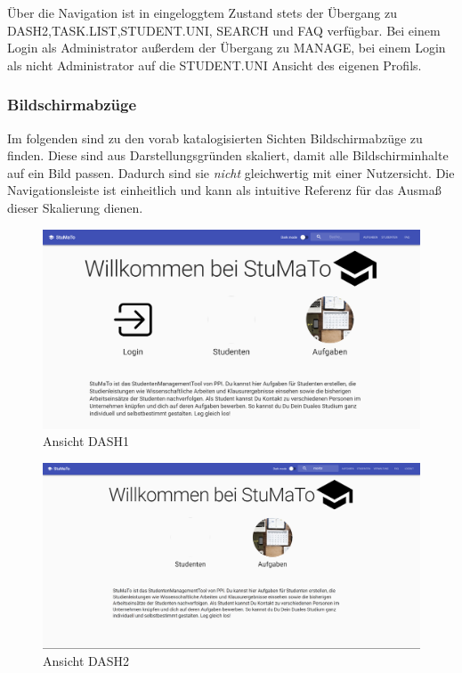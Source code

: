 \documentclass[
  12pt,
  ngerman,
  a4paper,
]{article}
\begin{document}
Über die Navigation ist in eingeloggtem Zustand stets der Übergang zu
DASH2,TASK.LIST,STUDENT.UNI, SEARCH und FAQ verfügbar. Bei einem Login
als Administrator außerdem der Übergang zu MANAGE, bei einem Login als
nicht Administrator auf die STUDENT.UNI Ansicht des eigenen Profils.

\hypertarget{bildschirmabzuxfcge}{%
\subsubsection{Bildschirmabzüge}\label{bildschirmabzuxfcge}}

Im folgenden sind zu den vorab katalogisierten Sichten Bildschirmabzüge
zu finden. Diese sind aus Darstellungsgründen skaliert, damit alle
Bildschirminhalte auf ein Bild passen. Dadurch sind sie \emph{nicht}
gleichwertig mit einer Nutzersicht. Die Navigationsleiste ist
einheitlich und kann als intuitive Referenz für das Ausmaß dieser
Skalierung dienen.

\begin{figure}
\centering
\includegraphics{./tex2pdf.-930e6666e1221838/fe0842637e9fead37869fdcec161ed1e5a86af1b.png}
\caption{Ansicht DASH1}
\end{figure}

\begin{figure}
\centering
\includegraphics{./tex2pdf.-930e6666e1221838/e6625bd35d85ef948eab18a123670b53a969f56c.png}
\caption{Ansicht DASH2}
\end{figure}
\end{document}
